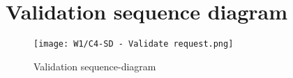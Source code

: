 \section{Validation sequence diagram}\label{appendix:validation-sequence-diagram}
\begin{figure}[hbt!]
  \centering
  \texttt{[image: W1/C4-SD - Validate request.png]}
  \caption{Validation sequence-diagram}
  \label{fig:validation-sequence-diagram}
\end{figure}

\newpage